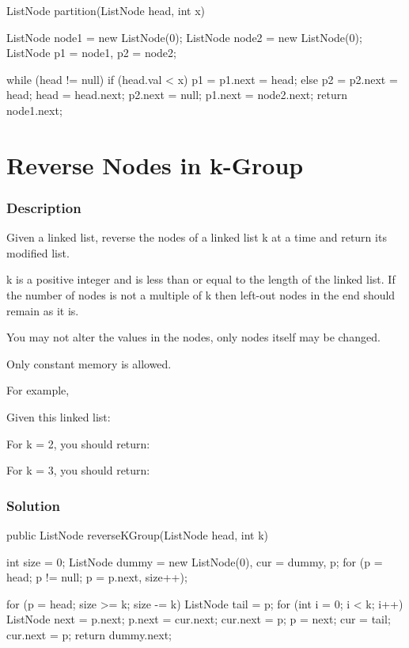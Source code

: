 \begin{Code}
ListNode partition(ListNode head, int x) {
    ListNode node1 = new ListNode(0);
    ListNode node2 = new ListNode(0);
    ListNode p1 = node1, p2 = node2;

    while (head != null) {
        if (head.val < x)
            p1 = p1.next = head;
        else
            p2 = p2.next = head;
        head = head.next;
    }
    p2.next = null;
    p1.next = node2.next;
    return node1.next;
}
\end{Code}

\newpage

\section{Reverse Nodes in k-Group} %

\subsubsection{Description}
Given a linked list, reverse the nodes of a linked list k at a time and return its modified list.

k is a positive integer and is less than or equal to the length of the linked list. If the number of nodes is not a multiple of k then left-out nodes in the end should remain as it is.

You may not alter the values in the nodes, only nodes itself may be changed.

Only constant memory is allowed.

For example,

Given this linked list: 

For k = 2, you should return: 

For k = 3, you should return: 

\subsubsection{Solution}

\begin{Code}
public ListNode reverseKGroup(ListNode head, int k) {
    int size = 0;
    ListNode dummy = new ListNode(0), cur = dummy, p;
    for (p = head; p != null; p = p.next, size++);

    for (p = head; size >= k; size -= k) {
        ListNode tail = p;
        for (int i = 0; i < k; i++) {
            ListNode next = p.next;
            p.next = cur.next;
            cur.next = p;
            p = next;
        }
        cur = tail;
    }
    cur.next = p;
    return dummy.next;
}
\end{Code}

